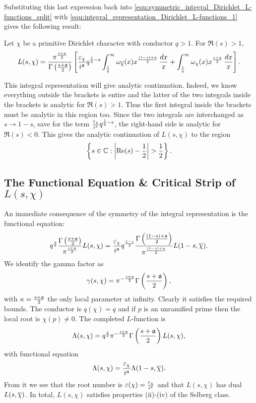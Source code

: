       Substituting this last expression back into \cref{equ:symmetric_integral_Dirichlet_L-functions_split} with \cref{equ:integral_representation_Dirichlet_L-functions_1} gives the following result:
      \begin{theorem}
        Let $\chi$ be a primitive Dirichlet character with conductor $q > 1$. For $\Re(s) > 1$,
        \[
          L(s,\chi) = \frac{\pi^{\frac{s+\mathfrak{a}}{2}}}{\Gamma\left(\frac{s+\mathfrak{a}}{2}\right)}\left[\frac{\varepsilon_{\chi}}{i^{\mathfrak{a}}}q^{\frac{1}{2}-s}\int_{\frac{1}{q}}^{\infty}\omega_{\overline{\chi}}(x)x^{\frac{(1-s)+\mathfrak{a}}{2}}\,\frac{dx}{x}+\int_{\frac{1}{q}}^{\infty}\omega_{\chi}(x)x^{\frac{s+\mathfrak{a}}{2}}\,\frac{dx}{x}\right].
        \]
      \end{theorem}

      This integral representation will give analytic continuation. Indeed, we know everything outside the brackets is entire and the latter of the two integrals inside the brackets is analytic for $\Re(s) > 1$. Thus the first integral inside the brackets must be analytic in this region too. Since the two integrals are interchanged as $s \to 1-s$, save for the term $\frac{\varepsilon_{\chi}}{i^{\mathfrak{a}}}q^{\frac{1}{2}-s}$, the right-hand side is analytic for $\Re(s) < 0$. This gives the analytic continuation of $L(s,\chi)$ to the region
      \[
        \left\{s \in \mathbb{C}:\left|\mathrm{Re}(s)-\frac{1}{2}\right| > \frac{1}{2}\right\}.
      \]
    \subsection*{The Functional Equation \& Critical Strip of \texorpdfstring{$L(s,\chi)$}{L(s,\chi)}}
      An immediate consequence of the symmetry of the integral representation is the functional equation:
      \[
        q^{\frac{s}{2}}\frac{\Gamma\left(\frac{s+\mathfrak{a}}{2}\right)}{\pi^{\frac{s+\mathfrak{a}}{2}}}L(s,\chi) = \frac{\varepsilon_{\chi}}{i^{\mathfrak{a}}}q^{\frac{1-s}{2}}\frac{\Gamma\left(\frac{(1-s)+\mathfrak{a}}{2}\right)}{\pi^{\frac{(1-s)+\mathfrak{a}}{2}}}L(1-s,\overline{\chi}).
      \]
      We identify the gamma factor as
      \[
        \gamma(s,\chi) = \pi^{-\frac{s+\mathfrak{a}}{2}}\Gamma\left(\frac{s+\mathfrak{a}}{2}\right),
      \]
      with $\kappa = \frac{s+\mathfrak{a}}{2}$ the only local parameter at infinity. Clearly it satisfies the required bounds. The conductor is $q(\chi) = q$ and if $p$ is an unramified prime then the local root is $\chi(p) \neq 0$. The completed $L$-function is
      \[
        \Lambda(s,\chi) = q^{\frac{s}{2}}\pi^{-\frac{s+\mathfrak{a}}{2}}\Gamma\left(\frac{s+\mathfrak{a}}{2}\right)L(s,\chi),
      \]
      with functional equation
      \[
        \Lambda(s,\chi) = \frac{\varepsilon_{\chi}}{i^{\mathfrak{a}}}\Lambda(1-s,\overline{\chi}).
      \]
      From it we see that the root number is $\varepsilon(\chi) = \frac{\varepsilon_{\chi}}{i^{\mathfrak{a}}}$ and that $L(s,\chi)$ has dual $L(s,\overline{\chi})$. In total, $L(s,\chi)$ satisfies properties (ii)-(iv) of the Selberg class.


